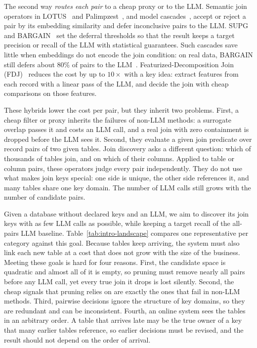 The second way \emph{routes each pair} to a cheap proxy or to the LLM.
Semantic join operators in LOTUS~\cite{LOTUS} and Palimpzest~\cite{Palimpzest}, and model cascades~\cite{FrugalGPT}, accept or reject a pair by its embedding similarity and defer inconclusive pairs to the LLM.
SUPG~\cite{SUPG} and BARGAIN~\cite{BARGAIN} set the deferral thresholds so that the result keeps a target precision or recall of the LLM with statistical guarantees.
Such cascades save little when embeddings do not encode the join condition: on real data, BARGAIN still defers about 80\% of pairs to the LLM~\cite{FDJ}.
Featurized-Decomposition Join (FDJ)~\cite{FDJ} reduces the cost by up to $10\times$ with a key idea: extract features from each record with a linear pass of the LLM, and decide the join with cheap comparisons on those features.

These hybrids lower the cost per pair, but they inherit two problems.
First, a cheap filter or proxy inherits the failures of non-LLM methods: a surrogate overlap passes it and costs an LLM call, and a real join with zero containment is dropped before the LLM sees it.
Second, they evaluate a given join predicate over record pairs of two given tables.
Join discovery asks a different question: which of thousands of tables join, and on which of their columns.
Applied to table or column pairs, these operators judge every pair independently.
They do not use what makes join keys special: one side is unique, the other side references it, and many tables share one key domain.
The number of LLM calls still grows with the number of candidate pairs.



 Given a database without declared keys and an LLM, we aim to discover its join keys with as few LLM calls as possible, while keeping a target recall of the all-pairs LLM baseline.
Table~\ref{tab:intro-landscape} compares one representative per category against this goal.
Because tables keep arriving, the system must also link each new table at a cost that does not grow with the size of the business.
Meeting these goals is hard for four reasons.
First, the candidate space is quadratic and almost all of it is empty, so pruning must remove nearly all pairs before any LLM call, yet every true join it drops is lost silently.
Second, the cheap signals that pruning relies on are exactly the ones that fail in non-LLM methods.
Third, pairwise decisions ignore the structure of key domains, so they are redundant and can be inconsistent.
Fourth, an online system sees the tables in an arbitrary order.
A table that arrives late may be the true owner of a key that many earlier tables reference, so earlier decisions must be revised, and the result should not depend on the order of arrival.

